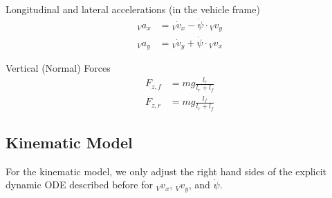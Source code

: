 \documentclass[
a4paper, %
10pt, %
notitlepage,
english]{CSUniSchoolLabReport}
\begin{document}
Longitudinal and lateral accelerations (in the vehicle frame)
\begin{align}
	{}_V a_x &= {}_V\dot{v}_x - \dot{\psi} \cdot {}_V v_y \\
	{}_V a_y &= {}_V\dot{v}_y + \dot{\psi} \cdot {}_V v_x
\end{align}

Vertical (Normal) Forces
\begin{align}
	F_{z, f} &= m g \frac{l_r}{l_r+l_f}\\
	F_{z, r} &= m g \frac{l_f}{l_r+l_f}
\end{align}

\subsection{Kinematic Model}

For the kinematic model, we only adjust the right hand sides of the explicit dynamic ODE described before for ${}_Vv_x$, ${}_Vv_y$, and $\dot{\psi}$.
\end{document}

